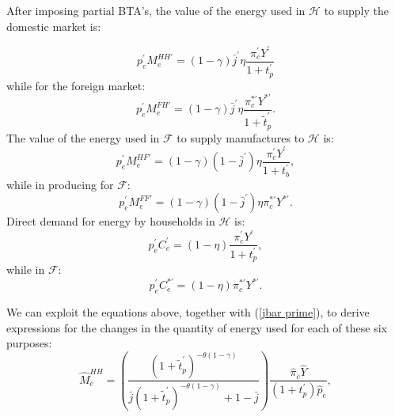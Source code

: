 \documentclass[notitlepage,12pt]{article}
\begin{document}
After imposing partial BTA's, the value of the energy used in $\mathcal{H}$
to supply the domestic market is:

\begin{equation*}
p_{e}^{\prime }M_{e}^{HH\prime }=\left( 1-\gamma \right) \bar{j}^{\prime
}\eta \frac{\pi _{c}^{\prime }Y^{\prime }}{1+t_{p}^{\prime }}
\end{equation*}%
while for the foreign market:%
\begin{equation*}
p_{e}^{\prime }M_{e}^{FH\prime }=\left( 1-\gamma \right) \bar{j}^{\prime
}\eta \frac{\pi _{c}^{\ast \prime }Y^{\ast \prime }}{1+\tilde{t}_{p}^{\prime
}}.
\end{equation*}%
The value of the energy used in $\mathcal{F}$ to supply manufactures to $%
\mathcal{H}$ is:%
\begin{equation*}
p_{e}^{\prime }M_{e}^{HF\prime }=\left( 1-\gamma \right) \left( 1-\bar{j}%
^{\prime }\right) \eta \frac{\pi _{c}^{\prime }Y^{\prime }}{1+t_{b}^{\prime }%
},
\end{equation*}%
while in producing for $\mathcal{F}$:%
\begin{equation*}
p_{e}^{\prime }M_{e}^{FF\prime }=\left( 1-\gamma \right) \left( 1-\bar{j}%
^{\prime }\right) \eta \pi _{c}^{\ast \prime }Y^{\ast \prime }.
\end{equation*}%
Direct demand for energy by households in $\mathcal{H}$ is:%
\begin{equation*}
p_{e}^{\prime }C_{e}^{\prime }=\left( 1-\eta \right) \frac{\pi _{c}^{\prime
}Y^{\prime }}{1+t_{p}^{\prime }},
\end{equation*}%
while in $\mathcal{F}$:%
\begin{equation*}
p_{e}^{\prime }C_{e}^{\ast \prime }=\left( 1-\eta \right) \pi _{c}^{\ast
\prime }Y^{\ast \prime }.
\end{equation*}

We can exploit the equations above, together with (\ref{jbar prime}), to
derive expressions for the changes in the quantity of energy used for each
of these six purposes:%
\begin{equation}
\hat{M}_{e}^{HH}=\left( \frac{\left( 1+\tilde{t}_{p}^{\prime }\right)
^{-\theta \left( 1-\gamma \right) }}{\bar{j}\left( 1+\tilde{t}_{p}^{\prime
}\right) ^{-\theta \left( 1-\gamma \right) }+1-\bar{j}}\right) \frac{\hat{\pi%
}_{c}\hat{Y}}{\left( 1+t_{p}^{\prime }\right) \hat{p}_{e}},  \label{MhatH}
\end{equation}
\end{document}
